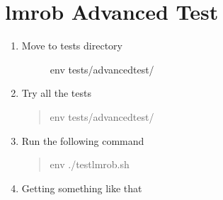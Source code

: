 \documentclass[letterpaper,10pt,english]{sphinxmanual}
\begin{document}
\section{lmrob Advanced Test}
\label{\detokenize{tests:lmrob-advanced-test}}\begin{enumerate}
\item {} \begin{description}
\item[{Move to tests directory}] \leavevmode
{}%
\begin{sphinxVerbatim}[commandchars=\\\{\}]
env \PYGZdl{}  tests/advancedtest/
\end{sphinxVerbatim}

\end{description}

\item {} 
Try all the tests
\begin{quote}

%
\begin{sphinxVerbatim}[commandchars=\\\{\}]
env \PYGZdl{}  tests/advancedtest/
\end{sphinxVerbatim}
\end{quote}

\item {} 
Run the following command
\begin{quote}

%
\begin{sphinxVerbatim}[commandchars=\\\{\}]
env \PYGZdl{} ./test\PYGZus{}lmrob.sh
\end{sphinxVerbatim}
\end{quote}

\item {} 
Getting something like that
\begin{quote}


\end{quote}
\end{enumerate}
\end{document}
